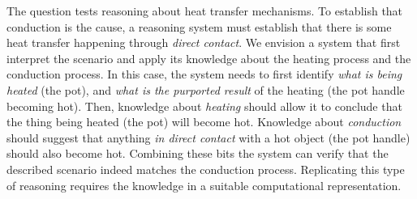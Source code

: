

The question tests reasoning about heat transfer mechanisms.
To establish that conduction is the cause, a reasoning system must establish that there is some heat transfer happening through {\em direct contact}. 
We envision a system that first interpret the scenario and apply its knowledge about the heating process and the conduction process. 
In this case, the system needs to first identify {\em what is being heated} (the pot), and {\em what is the purported result} of the heating (the pot handle becoming hot). 
Then, knowledge about {\em heating} should allow it to conclude that the thing being heated (the pot) will become hot. 
Knowledge about {\em conduction} should suggest that anything {\em in direct contact} with a hot object (the pot handle) should also become hot.
Combining these bits the system can verify that the described scenario indeed matches the conduction process.
Replicating this type of reasoning requires the knowledge in a suitable computational representation.

